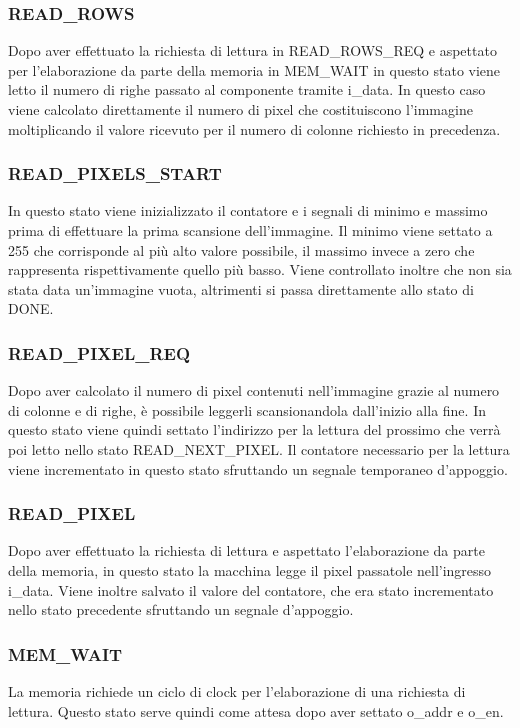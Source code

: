 \documentclass{article}
\begin{document}
\subsubsection{READ\_ROWS}
Dopo aver effettuato la richiesta di lettura in READ\_ROWS\_REQ e aspettato per l'elaborazione da parte della memoria in MEM\_WAIT in questo stato viene letto il numero di righe passato al componente tramite i\_data. In questo caso viene calcolato direttamente il numero di pixel che costituiscono l'immagine moltiplicando il valore ricevuto per il numero di colonne richiesto in precedenza.

\subsubsection{READ\_PIXELS\_START}
In questo stato viene inizializzato il contatore  e i segnali di minimo e massimo prima di effettuare la prima scansione dell'immagine. Il minimo viene settato a 255 che corrisponde al più alto valore possibile, il massimo invece a zero che rappresenta rispettivamente quello più basso. Viene controllato inoltre che non sia stata data un'immagine vuota, altrimenti si passa direttamente allo stato di DONE.

\subsubsection{READ\_PIXEL\_REQ}
Dopo aver calcolato il numero di pixel contenuti nell'immagine grazie al numero di colonne e di righe, è possibile leggerli scansionandola dall'inizio alla fine. In questo stato viene quindi settato l'indirizzo per la lettura del prossimo che verrà poi letto nello stato READ\_NEXT\_PIXEL. Il contatore necessario per la lettura viene incrementato in questo stato sfruttando un segnale temporaneo d'appoggio.

\subsubsection{READ\_PIXEL}
Dopo aver effettuato la richiesta di lettura e aspettato l'elaborazione da parte della memoria, in questo stato la macchina legge il pixel passatole nell'ingresso i\_data. Viene inoltre salvato il valore del contatore, che era stato incrementato nello stato precedente sfruttando un segnale d'appoggio.

\subsubsection{MEM\_WAIT}
La memoria richiede un ciclo di clock per l'elaborazione di una richiesta di lettura. Questo stato serve quindi come attesa dopo aver settato o\_addr e o\_en.
\end{document}
